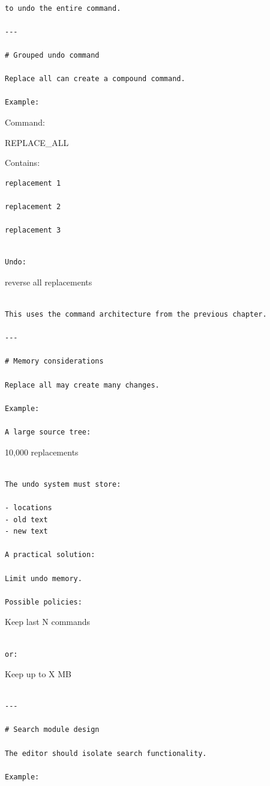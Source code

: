 \documentclass[
  oneside,
  openany]{book}
\begin{document}
\begin{verbatim}

to undo the entire command.

---

# Grouped undo command

Replace all can create a compound command.

Example:
\end{verbatim}

Command:

REPLACE\_ALL

Contains:

\begin{verbatim}
replacement 1

replacement 2

replacement 3
\end{verbatim}

\begin{verbatim}

Undo:
\end{verbatim}

reverse all replacements

\begin{verbatim}

This uses the command architecture from the previous chapter.

---

# Memory considerations

Replace all may create many changes.

Example:

A large source tree:
\end{verbatim}

10,000 replacements

\begin{verbatim}

The undo system must store:

- locations
- old text
- new text

A practical solution:

Limit undo memory.

Possible policies:
\end{verbatim}

Keep last N commands

\begin{verbatim}

or:
\end{verbatim}

Keep up to X MB

\begin{verbatim}

---

# Search module design

The editor should isolate search functionality.

Example:
\end{verbatim}
\end{document}
